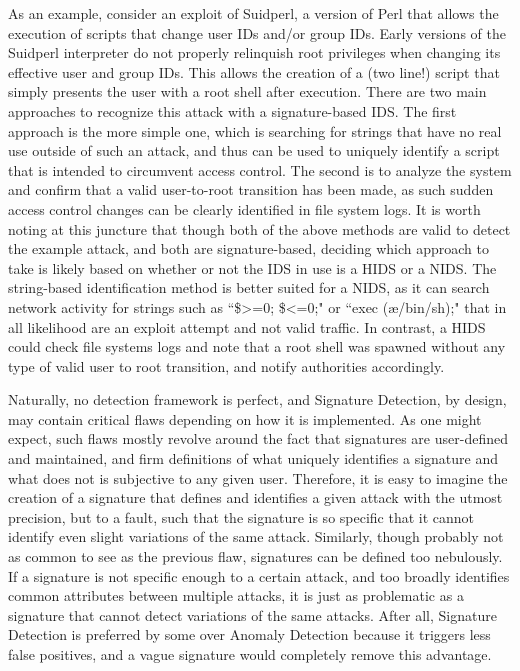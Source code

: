 \documentclass{acm_proc_article-sp}
\begin{document}
	    	As an example, consider an exploit of Suidperl, a version of Perl that allows the execution of scripts that change user IDs and/or group IDs. Early versions of the Suidperl interpreter do not properly relinquish  root privileges when changing its effective user and group IDs. This allows the creation of a (two line!) script that simply presents the user with a root shell after execution. There are two main approaches to recognize this attack with a signature-based IDS. The first approach is the more simple one, which is searching for strings that have no real use outside of such an attack, and thus can be used to uniquely identify a script that is intended to circumvent access control. The second is to analyze the system and confirm that a valid user-to-root transition has been made, as such sudden access control changes can be clearly identified in file system logs. It is worth noting at this juncture that though both of the above methods are valid to detect the example attack, and both are signature-based, deciding which approach to take is likely based on whether or not the IDS in use is a HIDS or a NIDS. The string-based identification method is better suited for a NIDS, as it can search network activity for strings such as ``\$>=0; \$<=0;" or ``exec (\ae/bin/sh);" that in all likelihood are an exploit attempt and not valid traffic. In contrast, a HIDS could check file systems logs and note that a root shell was spawned without any type of valid user to root transition, and notify authorities accordingly. 
	    	
	    	Naturally, no detection framework is perfect, and Signature Detection, by design, may contain critical flaws depending on how it is implemented. As one might expect, such flaws mostly revolve around the fact that signatures are user-defined and maintained, and firm definitions of what uniquely identifies a signature and what does not is subjective to any given user. Therefore, it is easy to imagine the creation of a signature that defines and identifies a given attack with the utmost precision, but to a fault, such that the signature is so specific that it cannot identify even slight variations of the same attack. Similarly, though probably not as common to see as the previous flaw, signatures can be defined too nebulously. If a signature is not specific enough to a certain attack, and too broadly identifies common attributes between multiple attacks, it is just as problematic as a signature that cannot detect variations of the same attacks. After all, Signature Detection is preferred by some over Anomaly Detection because it triggers less false positives, and a vague signature would completely remove this advantage. 
	    	
\end{document}
